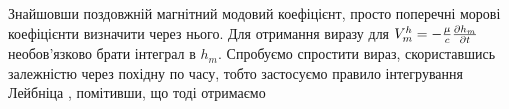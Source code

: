 Знайшовши поздовжній магнітний модовий коефіцієнт, просто поперечні морові 
коефіцієнти визначити через нього. Для отримання виразу для 
$ V_m^h = - \frac{\mu}{c} \frac{\partial h_m}{\partial t} $ необов'язково брати інтеграл в 
$ h_m $. Спробуємо спростити вираз, скориставшись залежністю через похідну по 
часу, тобто застосуємо правило інтегрування Лейбніца \cite{imp:Flanders1973}, 
помітивши, що
%
%
тоді отримаємо
%
%
%
